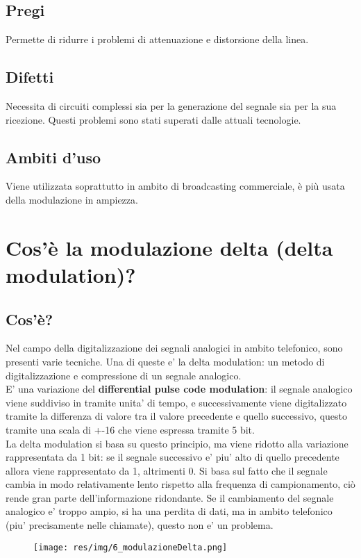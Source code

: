 \subsection{Pregi}
Permette di ridurre i problemi di attenuazione e distorsione della linea.
\subsection{Difetti}
Necessita di circuiti complessi sia per la generazione del segnale sia per la sua ricezione. Questi problemi sono stati superati dalle attuali tecnologie.
\subsection{Ambiti d'uso}
Viene utilizzata soprattutto in ambito di broadcasting commerciale, è più usata della modulazione in ampiezza.

\section{Cos'è la modulazione delta (delta modulation)?}\label{deltaMod}
\subsection{Cos'è?}
Nel campo della digitalizzazione dei segnali analogici in ambito telefonico, sono presenti varie tecniche. Una di queste e' la delta modulation: un metodo di digitalizzazione e compressione di un segnale analogico.\\
E' una variazione del \textbf{differential pulse code modulation}: il segnale analogico viene suddiviso in tramite unita' di tempo, e successivamente viene digitalizzato tramite la differenza di valore tra il valore precedente e quello successivo, questo tramite una scala di +-16 che viene espressa tramite 5 bit.\\
La delta modulation si basa su questo principio, ma viene ridotto alla variazione rappresentata da 1 bit: se il segnale successivo e' piu' alto di quello precedente allora viene rappresentato da 1, altrimenti 0. Si basa sul fatto che il segnale cambia in modo relativamente lento rispetto alla frequenza di campionamento, ciò rende gran parte dell'informazione ridondante. 
Se il cambiamento del segnale analogico e' troppo ampio, si ha una perdita di dati, ma in ambito telefonico (piu' precisamente nelle chiamate), questo non e' un problema.

\begin{figure}[H]
\centering
\texttt{[image: res/img/6\_modulazioneDelta.png]}
\end{figure}


